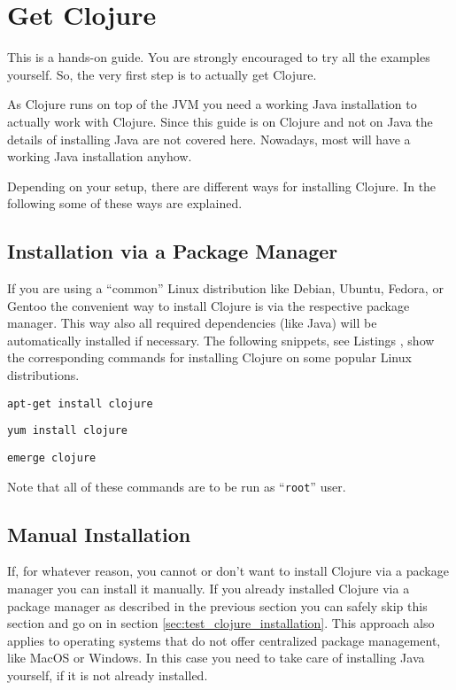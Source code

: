 \chapter{Get Clojure}
\label{sec:get_clojure}
This is a hands-on guide.
You are strongly encouraged to try all the examples yourself.
So, the very first step is to actually get Clojure.

As Clojure runs on top of the JVM you need a working Java installation to actually work with Clojure.
Since this guide is on Clojure and not on Java the details of installing Java are not covered here.
Nowadays, most will have a working Java installation anyhow.

Depending on your setup, there are different ways for installing Clojure.
In the following some of these ways are explained.

\section{Installation via a Package Manager}
\label{sec:install_via_package_manager}
If you are using a ``common'' Linux distribution like Debian, Ubuntu, Fedora, or Gentoo the convenient way to install Clojure is via the respective package manager.
This way also all required dependencies (like Java) will be automatically installed if necessary.
The following snippets, see Listings , show the corresponding commands for installing Clojure on some popular Linux distributions.

\begin{lstlisting}[label=lst:clojure_install_debian, caption=Installation of Clojure on Debian and Debian-based distributions like Ubuntu or Kubuntu]
apt-get install clojure
\end{lstlisting}

\begin{lstlisting}[label=lst:clojure_install_fedora, caption=Installation of Clojure on Fedora or Red Hat]
yum install clojure
\end{lstlisting}

\begin{lstlisting}[label=lst:clojure_install_gentoo, caption=Installation of Clojure on Gentoo or Funtoo]
emerge clojure
\end{lstlisting}

Note that all of these commands are to be run as ``\texttt{root}'' user.

\section{Manual Installation}
\label{sec:manual_install}
If, for whatever reason, you cannot or don't want to install Clojure via a package manager you can install it manually.
If you already installed Clojure via a package manager as described in the previous section you can safely skip this section and go on in section \vref{sec:test_clojure_installation}.
This approach also applies to operating systems that do not offer centralized package management, like MacOS or Windows.
In this case you need to take care of installing Java yourself, if it is not already installed.

